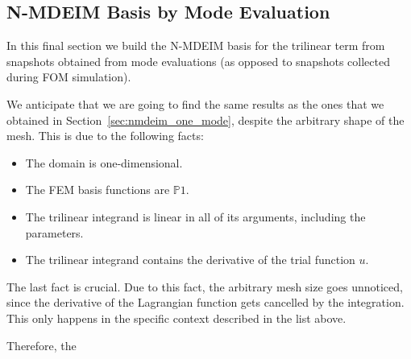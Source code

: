 \documentclass[../../thesis.tex]{subfiles}
\begin{document}
\clearpage
\subsection{N-MDEIM Basis by Mode Evaluation}
In this final section we build the N-MDEIM basis for the trilinear term
from snapshots obtained from mode evaluations 
(as opposed to snapshots collected during FOM simulation).

We anticipate that we are going to find the same results as the ones that we obtained in
Section~\ref{sec:nmdeim_one_mode}, despite the arbitrary shape of the mesh.
This is due to the following facts:
\begin{itemize}
    \item The domain is one-dimensional.
    \item The FEM basis functions are $\mathbb{P}1$.
    \item The trilinear integrand is linear in all of its arguments, including the parameters.
    \item The trilinear integrand contains the derivative of the trial function $u$.
\end{itemize}
The last fact is crucial. 
Due to this fact, the arbitrary mesh size goes unnoticed, 
since the derivative of the Lagrangian function gets cancelled by the integration.
This only happens in the specific context described in the list above.

Therefore, the 
\end{document}
